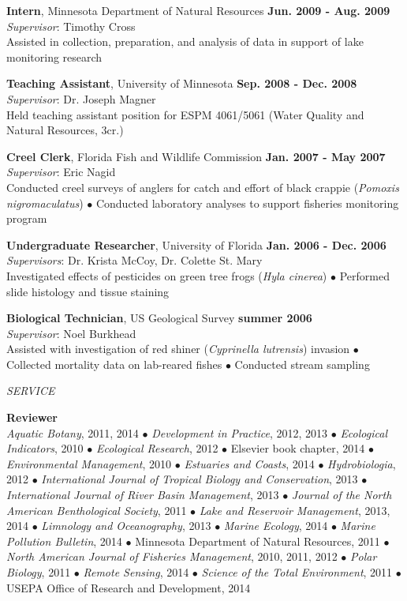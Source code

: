 \documentclass[letterpaper,12pt]{article}
\newcommand{\sectitle}[1]{\vspace{\baselineskip} \centerline{\large{\textit{#1}}}}
\begin{document}
{\bf Intern}, Minnesota Department of Natural Resources \hfill {\bf Jun. 2009 - Aug. 2009} \\
\textit{Supervisor}: Timothy Cross \\
Assisted in collection, preparation, and analysis of data in support of lake monitoring research

{\bf Teaching Assistant}, University of Minnesota \hfill {\bf Sep. 2008 - Dec. 2008} \\
\textit{Supervisor}: Dr. Joseph Magner \\
Held teaching assistant position for ESPM 4061/5061 (Water Quality and Natural Resources, 3cr.)

{\bf Creel Clerk}, Florida Fish and Wildlife Commission \hfill {\bf Jan. 2007 - May 2007} \\
\textit{Supervisor}: Eric Nagid \\
Conducted creel surveys of anglers for catch and effort of black crappie (\textit{Pomoxis nigromaculatus}) $\bullet$ Conducted laboratory analyses to support fisheries monitoring program

{\bf Undergraduate Researcher}, University of Florida \hfill {\bf Jan. 2006 - Dec. 2006} \\
\textit{Supervisors}: Dr. Krista McCoy, Dr. Colette St. Mary \\
Investigated effects of pesticides on green tree frogs (\textit{Hyla cinerea}) $\bullet$ Performed slide histology and tissue staining

{\bf Biological Technician}, US Geological Survey \hfill {\bf summer 2006} \\
\textit{Supervisor}: Noel Burkhead \\
Assisted with investigation of red shiner (\textit{Cyprinella lutrensis}) invasion $\bullet$ Collected mortality data on lab-reared fishes $\bullet$ Conducted stream sampling

\sectitle{SERVICE}

{\bf Reviewer}\hfill \\
\textit{Aquatic Botany}, 2011, 2014 $\bullet$ \textit{Development in Practice}, 2012, 2013 $\bullet$ \textit{Ecological Indicators}, 2010 $\bullet$ \textit{Ecological Research}, 2012 $\bullet$ Elsevier book chapter, 2014 $\bullet$ \textit{Environmental Management}, 2010 $\bullet$ \textit{Estuaries and Coasts}, 2014 $\bullet$ \textit{Hydrobiologia}, 2012 $\bullet$ \textit{International Journal of Tropical Biology and Conservation}, 2013 $\bullet$ \textit{International Journal of River Basin Management}, 2013 $\bullet$ \textit{Journal of the North American Benthological Society}, 2011 $\bullet$ \textit{Lake and Reservoir Management}, 2013, 2014 $\bullet$ \textit{Limnology and Oceanography}, 2013 $\bullet$ \textit{Marine Ecology}, 2014 $\bullet$ \textit{Marine Pollution Bulletin}, 2014 $\bullet$ Minnesota Department of Natural Resources, 2011 $\bullet$ \textit{North American Journal of Fisheries Management}, 2010, 2011, 2012 $\bullet$ \textit{Polar Biology}, 2011 $\bullet$ \textit{Remote Sensing}, 2014 $\bullet$ \textit{Science of the Total Environment}, 2011 $\bullet$ USEPA Office of Research and Development, 2014
\end{document}
